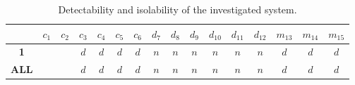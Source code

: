 \documentclass[a4,11pt]{article}
\begin{document}
\begin{table}[!htb]
\centering
\normalsize
\begin{tabular}{|c|c|c|c|c|c|c|c|c|c|c|c|c|c|c|c|}
\hline
~ & \textbf{$c_1$} & \textbf{$c_2$} & \textbf{$c_3$} & \textbf{$c_4$} & \textbf{$c_5$} & \textbf{$c_6$} & \textbf{$d_7$} & \textbf{$d_8$} & \textbf{$d_9$} & \textbf{$d_{10}$} & \textbf{$d_{11}$} & \textbf{$d_{12}$} & \textbf{$m_{13}$} & \textbf{$m_{14}$} & \textbf{$m_{15}$}\\ \hline 
\textbf{1} &  &  & $d$ & $d$ & $d$ & $d$ & $n$ & $n$ & $n$ & $n$ & $n$ & $n$ & $d$ & $d$ & $d$\\ \hline 
\textbf{ALL} &  &  & $d$ & $d$ & $d$ & $d$ & $n$ & $n$ & $n$ & $n$ & $n$ & $n$ & $d$ & $d$ & $d$\\ \hline 
\end{tabular}
\caption{Detectability and isolability of the investigated system.}
\label{tab:iso}
\end{table}
\end{document}
